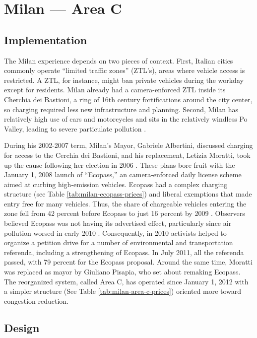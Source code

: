 
\section{Milan --- Area C}

\subsection{Implementation}

The Milan experience depends on two pieces of context. First, Italian cities commonly operate ``limited traffic zones'' (ZTL's), areas where vehicle access is restricted. A ZTL, for instance, might ban private vehicles during the workday except for residents. Milan already had a camera-enforced ZTL inside its Cherchia dei Bastioni, a ring of 16th century fortifications around the city center, so charging required less new infrastructure and planning. Second, Milan has relatively high use of cars and motorcycles and sits in the relatively windless Po Valley, leading to severe particulate pollution \citet{Rotaris2010}.

During his 2002-2007 term, Milan's Mayor, Gabriele Albertini, discussed charging for access to the Cerchia dei Bastioni, and his replacement, Letizia Moratti, took up the cause following her election in 2006 \citep{Mattioli2012}. These plans bore fruit with the January 1, 2008 launch of ``Ecopass,'' an camera-enforced daily license scheme aimed at curbing high-emission vehicles. Ecopass had a complex charging structure (see Table \ref{tab:milan-ecopass-prices}) and liberal exemptions that made entry free for many vehicles. Thus, the share of chargeable vehicles entering the zone fell from 42 percent before Ecopass to just 16 percent by 2009 \citep[p. 5, Table 3]{Danielis2011}. Observers believed Ecopass was not having its advertised effect, particularly since air pollution worsed in early 2010 \citep{Mattioli2012}. Consequently, in 2010 activists helped to organize a petition drive for a number of environmental and transportation referenda, including a strengthening of Ecopass. In July 2011, all the referenda passed, with 79 percent for the Ecopass proposal. Around the same time, Moratti was replaced as mayor by Giuliano Pisapia, who set about remaking Ecopass. The reorganized system, called Area C, has operated since January 1, 2012 with a simpler structure (See Table \ref{tab:milan-area-c-prices}) oriented more toward congestion reduction. 

\subsection{Design}

